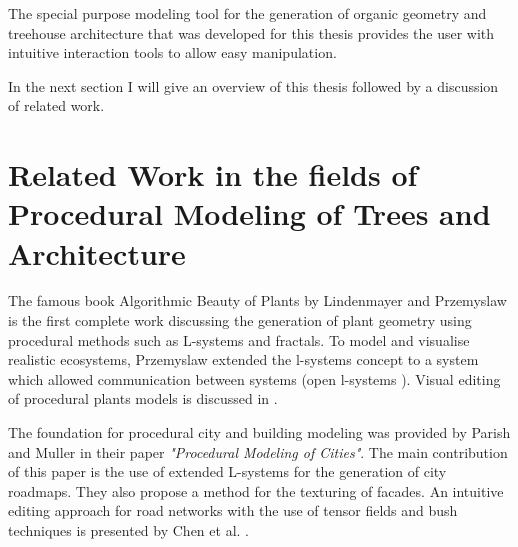 \documentclass{article}
\newcommand{\old}[1]{\textcolor{myGrey}{\small{\textbf{\newline Old: }\it{#1}}}}
\begin{document}
The special purpose modeling tool for the generation of organic geometry and treehouse architecture that was developed for this thesis provides the user with intuitive interaction tools to allow easy manipulation.        

In the next section I will give an overview of this thesis followed by a discussion of related work. 



\section{Related Work in the fields of Procedural Modeling of Trees and Architecture}

The famous book Algorithmic Beauty of Plants by Lindenmayer and Przemyslaw \cite{PrzemyslawAlgoBeauty} is the first complete work discussing the generation of plant geometry using procedural methods such as L-systems and fractals. To model and visualise realistic ecosystems, Przemyslaw extended the l-systems concept to a system which allowed communication between systems (open l-systems \cite{PrzemyslawPlants} \cite{Deussen98}). Visual editing of procedural plants models is discussed in \cite{interactivebonsai}. 

The foundation for procedural city and building modeling was provided by Parish and Muller \cite{Parish01} in their paper \emph{"Procedural Modeling of Cities"}. The main contribution of this paper is the use of extended L-systems for the generation of city roadmaps. They also propose a method for the texturing of facades. An intuitive editing approach for road networks with the use of tensor fields and bush techniques is presented by Chen et al. \cite{Chen08}. 
\end{document}
